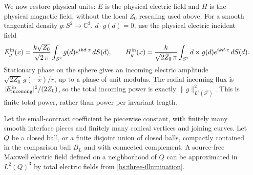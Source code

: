 We now restore physical units: $E$ is the physical electric field
and $H$ is the physical magnetic field, without the local $Z_0$
rescaling used above.  For a smooth tangential density
$g:S^2\to\mathbb C^3$,
$d\cdot g(d)=0$, use the physical electric incident field
\begin{equation}
 E_g^{\rm in}(x)=\frac{k\sqrt{Z_0}}{\sqrt2\,\pi}
                 \int_{S^2}g(d)e^{ikd\cdot x}\,dS(d),
 \qquad
 H_g^{\rm in}(x)=\frac{k}{\sqrt{2Z_0}\,\pi}
                 \int_{S^2}d\times g(d)e^{ikd\cdot x}\,dS(d).
 \label{hs:three-illumination}
\end{equation}
Stationary phase on the sphere gives an incoming electric amplitude
$\sqrt{2Z_0}\,g(-\widehat x)/r$, up to a phase of unit modulus.
The radial incoming flux is $|E^{\rm in}_{\rm incoming}|^2/(2Z_0)$,
so the total incoming power is exactly $\|g\|_{L^2(S^2)}^2$.
This is finite total power, rather than power per invariant length.

\begin{lemma}
\label{hs:three-runge}
Let the small-contrast coefficient be piecewise constant, with finitely
many smooth interface pieces and finitely many conical vertices and
joining curves.  Let $Q$ be a closed ball, or a finite disjoint union
of closed balls, compactly contained in the comparison ball $B_L$
and with connected complement.  A source-free Maxwell
electric field defined on a neighborhood of $Q$ can be approximated
in $L^2(Q)^3$ by total electric fields from
\eqref{hs:three-illumination}.
\end{lemma}

